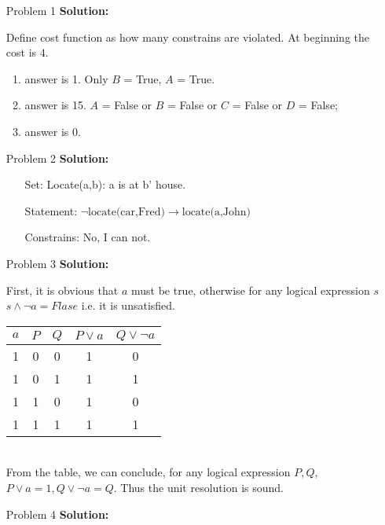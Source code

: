 \normalfont\documentclass[letterpaper,11pt]{article}
\begin{document}
\setlength{\parindent}{2ex}
\newcommand{\header}{
	\noindent {}
}
\bigskip
\header

\begin{enumerate}
\item[Problem 1]\textbf{Solution:}\par
	Define cost function as how many constrains are violated. At beginning the cost is $4$.
	\begin{enumerate}
		\item \par
			answer is 1.
			Only $B$ = True, $A$ = True.
		\item \par
			answer is 15.
			$A$ = False or $B$ = False or $C$ = False or $D$ = False;
		\item\par
			answer is 0.
	\end{enumerate}
\item[Problem 2]\textbf{Solution:}\par
	\begin{enumerate}
		\item[Set:]
			Locate(a,b): a is at b' house.			
		\item[Statement:]
			$\neg \text{locate(car,Fred)} \to \text{locate(a,John)}$
		\item[Constrains:]
			No, I can not.
	\end{enumerate}
\item [Problem 3]\textbf{Solution:}\par
First, it is obvious that $a$ must be true, otherwise for any logical expression $s$ $s \land \neg a = Flase$ i.e. it is unsatisfied.\par
\begin{tabular}{c|c|c|c|c}
			\hline
			$a$ & $P$ & $Q$ & $P\lor a$ & $Q \lor \neg a$   \\
			\hline
			1 & 0 & 0 & 1 & 0 \\
			1 & 0 & 1 & 1 & 1 \\
			1 & 1 & 0 & 1 & 0 \\
			1 & 1 & 1 & 1 & 1 \\
		\end{tabular}\\
		From the table, we can conclude, for any logical expression $P,Q$, $P\lor a = 1, Q\lor \neg a = Q$. Thus the unit resolution is sound.
\item[Problem 4]\textbf{Solution:}\par


\end{enumerate}
\end{document}
